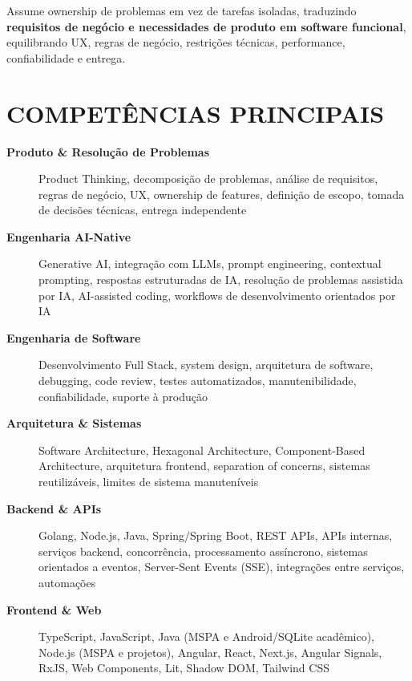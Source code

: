 \documentclass[10pt,a4paper]{article}
\begin{document}
Assume ownership de problemas em vez de tarefas isoladas,
traduzindo \textbf{requisitos de negócio e necessidades de produto
em software funcional}, equilibrando UX, regras de negócio,
restrições técnicas, performance, confiabilidade e entrega.


\section*{COMPETÊNCIAS PRINCIPAIS}

\footnotesize

\begin{description}

    \item[\textbf{Produto \& Resolução de Problemas}]
    Product Thinking, decomposição de problemas, análise de
    requisitos, regras de negócio, UX, ownership de features,
    definição de escopo, tomada de decisões técnicas,
    entrega independente

    \item[\textbf{Engenharia AI-Native}]
    Generative AI, integração com LLMs, prompt engineering,
    contextual prompting, respostas estruturadas de IA,
    resolução de problemas assistida por IA,
    AI-assisted coding, workflows de desenvolvimento
    orientados por IA

    \item[\textbf{Engenharia de Software}]
    Desenvolvimento Full Stack, system design, arquitetura de
    software, debugging, code review, testes automatizados,
    manutenibilidade, confiabilidade, suporte à produção

    \item[\textbf{Arquitetura \& Sistemas}]
    Software Architecture, Hexagonal Architecture,
    Component-Based Architecture, arquitetura frontend,
    separation of concerns, sistemas reutilizáveis,
    limites de sistema manuteníveis

    \item[\textbf{Backend \& APIs}]
    Golang, Node.js, Java, Spring/Spring Boot, REST APIs, APIs internas, serviços backend,
    concorrência, processamento assíncrono, sistemas orientados
    a eventos, Server-Sent Events (SSE), integrações entre
    serviços, automações

    \item[\textbf{Frontend \& Web}]
    TypeScript, JavaScript, Java (MSPA e Android/SQLite acadêmico), Node.js (MSPA e projetos), Angular, React, Next.js,
    Angular Signals, RxJS, Web Components, Lit,
    Shadow DOM, Tailwind CSS


\end{description}
\end{document}
